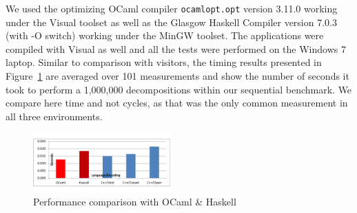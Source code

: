 

We used the optimizing OCaml compiler \texttt{ocamlopt.opt} version 3.11.0 working 
under the Visual \Cpp{} toolset as well as the Glasgow Haskell Compiler version 
7.0.3 (with -O switch) working under the MinGW toolset. The \Cpp{} applications 
were compiled with Visual \Cpp{} as well and all the tests were  
performed on the Windows 7 laptop. Similar to comparison with visitors,
the timing results presented in Figure~\ref{fig:OCamlComparison} are averaged 
over 101 measurements and show the number of seconds it took to perform a 
1,000,000 decompositions within our sequential benchmark. We compare here time 
and not cycles, as that was the only common measurement in all three 
environments.

\begin{figure}[htbp]
  \centering
    \includegraphics[width=0.47\textwidth]{OCamlComparison.pdf}
  \caption{Performance comparison with OCaml \& Haskell}
  \label{fig:OCamlComparison}
\end{figure}


